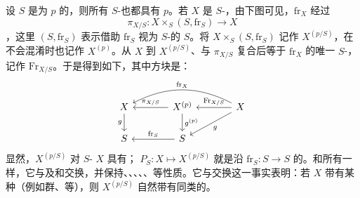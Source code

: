 设 $S$ 是为 $p$ 的，则所有 $S$-也都具有 $p$。若 $X$ 是 $S$-，由下图可见，$\mathrm{fr}_X$ 经过
\[
\pi_{X/S}:X\times_S(S,\mathrm{fr}_S)\longrightarrow X
\]
，这里 $(S,\mathrm{fr}_S)$ 表示借助 $\mathrm{fr}_S$ 视为 $S$-的 $S$。将 $X\times_S(S,\mathrm{fr}_S)$ 记作 $X^{(p/S)}$，在不会混淆时也记作 $X^{(p)}$。从 $X$ 到 $X^{(p/S)}$、与 $\pi_{X/S}$ 复合后等于 $\mathrm{fr}_X$ 的唯一 $S$-，记作 $\mathrm{Fr}_{X/S}$。于是得到如下，其中方块是：
\[
\begin{tikzcd}[column sep=large]
X\arrow[d,"g"']&X^{(p)}\arrow[l,"\pi_{X/S}"']\arrow[d,"g^{(p)}"]&X\arrow[l,"\mathrm{Fr}_{X/S}"']\arrow[ll,bend right=27,"\mathrm{fr}_X"']\arrow[dl,"g"]\\
S&S\arrow[l,"\mathrm{fr}_S"']&
\end{tikzcd}
\]
显然，$X^{(p/S)}$ 对 $S$- $X$ 具有； $P_S:X\mapsto X^{(p/S)}$ 就是沿 $\mathrm{fr}_S:S\to S$ 的。和所有一样，它与及和交换，并保持、、、、、等性质。它与交换这一事实表明：若 $X$ 带有某种（例如群、等），则 $X^{(p/S)}$ 自然带有同类的。

